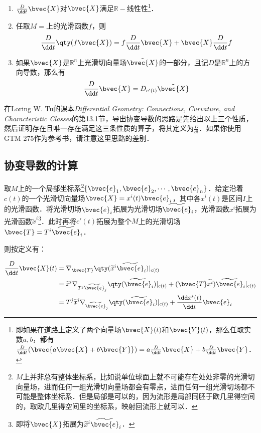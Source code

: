 \begin{enumerate}
\item $\frac{D}{\dd t}\bvec{X}$对$\bvec{X}$满足$\mathbb{R}-$线性性\footnote{即如果在道路上定义了两个向量场$\bvec{X}(t)$和$\bvec{Y}(t)$，那么任取实数$a, b$，都有$\frac{D}{\dd t}(\bvec{a\bvec{X}+b\bvec{Y}})=a\frac{D}{\dd t}\bvec{X}+b\frac{D}{\dd t}\bvec{Y}$．}．
\item 任取$M=$上的光滑函数$f$，则
\begin{equation}
\frac{D}{\dd t}\qty(f\bvec{X})=f\frac{D}{\dd t}\bvec{X}+\bvec{X}\frac{D}{\dd t}f
\end{equation}
\item 如果$\bvec{X}$是$\mathbb{R}^n$上光滑切向量场$\tilde{\bvec{X}}$的一部分，且记$D$是$\mathbb{R}^n$上的方向导数，那么有
\begin{equation}
\frac{D}{\dd t}\bvec{X}=D_{c'(t)}\tilde{\bvec{X}}
\end{equation}

\end{enumerate}

在Loring W. Tu的课本\textsl{Differential Geometry: Connections, Curvature, and Characteristic Classes}\cite{GTM275}的第13.1节，导出协变导数的思路是先给出以上三个性质，然后证明存在且唯一存在满足这三条性质的算子，将其定义为$\frac{D}{\dd t}$．如果你使用GTM 275作为参考书，请注意这里思路的差别．



\subsection{协变导数的计算}

取$M$上的一个局部坐标系\footnote{$M$上并非总有整体坐标系，比如说单位球面上就不可能存在处处非零的光滑切向量场，进而任何一组光滑切向量场都会有零点，进而任何一组光滑切场都不可能是整体坐标系．但是局部是可以的，因为流形是局部同胚于欧几里得空间的，取欧几里得空间里的坐标系，映射回流形上就可以．}$\{\bvec{e}_1, \bvec{e}_2, \cdots, \bvec{e}_n\}$．给定沿着$c(t)$的一个光滑切向量场$\bvec{X}=x^i(t)\bvec{e}_i$，其中各$x^i(t)$是区间$I$上的光滑函数．将光滑切场$\bvec{e}_i$拓展为光滑切场$\widetilde{\bvec{e}}_i$，光滑函数$x^i$拓展为光滑函数$\widetilde{x}^i$\footnote{即将$\bvec{X}$拓展为$\widetilde{x}^i\widetilde{\bvec{e}}_i$．}．此时再将$c'(t)$拓展为整个$M$上的光滑切场$\bvec{T}=T^i\widetilde{\bvec{e}}_i$．

则按定义有：

\begin{equation}\label{CoDer_eq5}
\begin{aligned}
\frac{D}{\dd t}\bvec{X}(t)&=\nabla_\bvec{T}\qty(\widetilde{x}^i\widetilde{\bvec{e}}_i)|_{c(t)}\\
&=\widetilde{x}^i\nabla_{T^j\widetilde{\bvec{e}}_j}\qty(\widetilde{\bvec{e}}_i)|_{c(t)}+(\bvec{T}\widetilde{x^i})\widetilde{\bvec{e}}_i|_{c(t)}\\
&=T^j\widetilde{x}^i\nabla_{\widetilde{\bvec{e}}_j}\qty(\widetilde{\bvec{e}}_i)|_{c(t)}+\frac{\dd x^i(t)}{\dd t}\bvec{e}_i\\
\end{aligned}
\end{equation}

